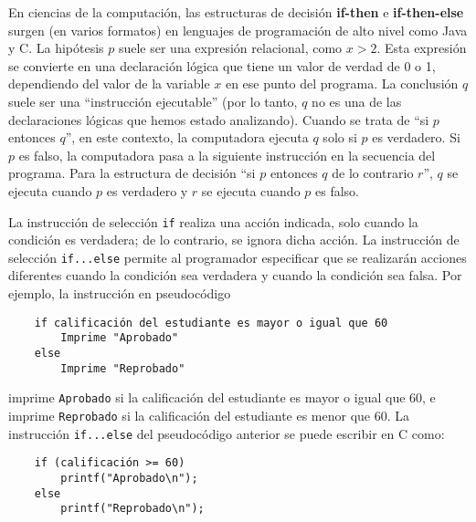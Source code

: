 \newpage

\begin{examplebox}{}{}
    En ciencias de la computación, las estructuras de decisión \textbf{if-then} e \textbf{if-then-else} surgen (en varios formatos) en lenguajes de programación de alto nivel como Java y C. La hipótesis $p$ suele ser una expresión relacional, como $x > 2$. Esta expresión se convierte en una declaración lógica que tiene un valor de verdad de 0 o 1, dependiendo del valor de la variable $x$ en ese punto del programa. La conclusión $q$ suele ser una “instrucción ejecutable” (por lo tanto, $q$ no es una de las declaraciones lógicas que hemos estado analizando). Cuando se trata de “si $p$ entonces $q$”, en este contexto, la computadora ejecuta $q$ solo si $p$ es verdadero. Si $p$ es falso, la computadora pasa a la siguiente instrucción en la secuencia del programa. Para la estructura de decisión “si $p$ entonces $q$ de lo contrario $r$”, $q$ se ejecuta cuando $p$ es verdadero y $r$ se ejecuta cuando $p$ es falso.

    \hspace{15pt}La instrucción de selección \texttt{if} realiza una acción indicada, solo cuando la condición es verdadera; de lo contrario, se ignora dicha acción. La instrucción de selección \texttt{if...else} permite al programador especificar que se realizarán acciones diferentes cuando la condición sea verdadera y cuando la condición sea falsa. Por ejemplo, la instrucción en pseudocódigo
    \begin{verbatim}
    if calificación del estudiante es mayor o igual que 60
        Imprime "Aprobado"
    else
        Imprime "Reprobado"
    \end{verbatim}
    imprime \texttt{Aprobado} si la calificación del estudiante es mayor o igual que 60, e imprime \texttt{Reprobado} si la calificación del estudiante es menor que 60. La instrucción \texttt{if...else} del pseudocódigo anterior se puede escribir en C como:
    \begin{verbatim}
    if (calificación >= 60)
        printf("Aprobado\n");
    else
        printf("Reprobado\n");
    \end{verbatim}
\end{examplebox}

